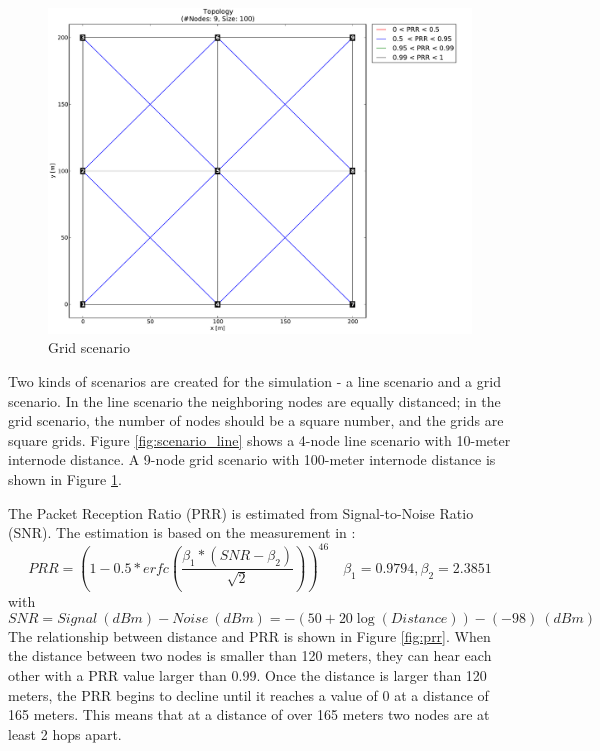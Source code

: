 \begin{figure}[!ht]	
  	\centering
    \leavevmode
      \includegraphics[scale=0.35]{Pics/results/topo9_dist100_grid.pdf}
    \caption{Grid scenario}
    \label{fig:scenario_grid}
\end{figure}

Two kinds of scenarios are created for the simulation - a line scenario and a grid scenario. In the line scenario the neighboring nodes are equally distanced; in the grid scenario, the number of nodes should be a square number, and the grids are square grids. Figure \ref{fig:scenario_line} shows a 4-node line scenario with 10-meter internode distance. A 9-node grid scenario with 100-meter internode distance is shown in Figure \ref{fig:scenario_grid}.
\newline

The Packet Reception Ratio (PRR) is estimated from Signal-to-Noise Ratio (SNR). The estimation is based on the measurement in \cite{RL08}:
\[
PRR = (1-0.5*erfc(\frac{\beta_1*(SNR-\beta_2)}{\sqrt{2}}))^{46}
\quad{\beta_1} = 0.9794, {\beta_2} = 2.3851
\] 
with 
\[
SNR = Signal\:(dBm)- Noise\:(dBm) = -(50 + 20 {\log}(Distance)) - (-98)\:(dBm)
\] 
The relationship between distance and PRR is shown in Figure \ref{fig:prr}. When the distance between two nodes is smaller than 120 meters, they can hear each other with a PRR value larger than 0.99. Once the distance is larger than 120 meters, the PRR begins to decline until it reaches a value of 0 at a distance of 165 meters. This means that at a distance of over 165 meters two nodes are at least 2 hops apart.

